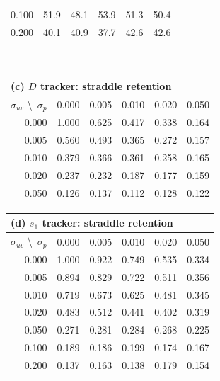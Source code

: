 \documentclass[lettersize,journal]{IEEEtran}
\begin{document}
\begin{table}[!t]
\begin{tabular}{r|rrrrr}
0.100 &  51.9 & 48.1 & 53.9 & 51.3 & 50.4 \\
0.200 &  40.1 & 40.9 & 37.7 & 42.6 & 42.6 \\
\hline
\end{tabular}
\\[8pt]
\begin{tabular}{r|rrrrr}
\multicolumn{6}{l}{(c) $D$ tracker: straddle retention} \\
\hline
$\sigma_{uv}$ \textbackslash\ $\sigma_p$ & 0.000 & 0.005 & 0.010 & 0.020 & 0.050 \\
\hline
0.000 & 1.000 & 0.625 & 0.417 & 0.338 & 0.164 \\
0.005 & 0.560 & 0.493 & 0.365 & 0.272 & 0.157 \\
0.010 & 0.379 & 0.366 & 0.361 & 0.258 & 0.165 \\
0.020 & 0.237 & 0.232 & 0.187 & 0.177 & 0.159 \\
0.050 & 0.126 & 0.137 & 0.112 & 0.128 & 0.122 \\
\hline
\end{tabular}
\hspace{1.5em}
\begin{tabular}{r|rrrrr}
\multicolumn{6}{l}{(d) $s_1$ tracker: straddle retention} \\
\hline
$\sigma_{uv}$ \textbackslash\ $\sigma_p$ & 0.000 & 0.005 & 0.010 & 0.020 & 0.050 \\
\hline
0.000 & 1.000 & 0.922 & 0.749 & 0.535 & 0.334 \\
0.005 & 0.894 & 0.829 & 0.722 & 0.511 & 0.356 \\
0.010 & 0.719 & 0.673 & 0.625 & 0.481 & 0.345 \\
0.020 & 0.483 & 0.512 & 0.441 & 0.402 & 0.319 \\
0.050 & 0.271 & 0.281 & 0.284 & 0.268 & 0.225 \\
0.100 & 0.189 & 0.186 & 0.199 & 0.174 & 0.167 \\
0.200 & 0.137 & 0.163 & 0.138 & 0.179 & 0.154 \\
\hline
\end{tabular}
\end{table}
\end{document}
